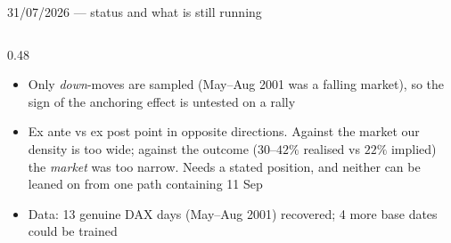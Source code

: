 \documentclass[aspectratio=169,11pt]{beamer}
\newcommand{\gold}[1]{{\color{ntugold}#1}}
\begin{document}
\begin{frame}[shrink=14]{31/07/2026 --- status and what is still running}
\begin{columns}[T]
\begin{column}{0.48\linewidth}
\begin{itemize}
        \item Only \emph{down}-moves are sampled (May--Aug 2001 was a falling market), so
              the sign of the anchoring effect is untested on a rally
        \item \gold{Ex ante vs ex post point in opposite directions.} Against the market our
              density is too wide; against the outcome ($30$--$42\%$ realised vs $22\%$
              implied) the \emph{market} was too narrow. Needs a stated position, and
              neither can be leaned on from one path containing 11 Sep
        \item \gold{Data}: 13 genuine DAX days (May--Aug 2001) recovered; 4 more base dates
              could be trained
      \end{itemize}
    \end{column}
  \end{columns}
\end{frame}
\end{document}
